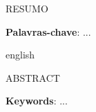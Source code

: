 




\setlength{\absparsep}{18pt} %
\begin{resumo}

	RESUMO

	\vspace{\onelineskip}
	\textbf{Palavras-chave}: ... 
\end{resumo}

\begin{resumo}[Abstract]
 \begin{otherlanguage*}{english}
	
	ABSTRACT
	
	\vspace{\onelineskip}
	\noindent 
	\textbf{Keywords}: ... 
 \end{otherlanguage*}
\end{resumo}

